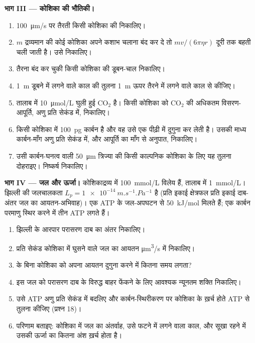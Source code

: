 \begin{problem}
\medskip
\noindent\textbf{भाग III --- कोशिका की भौतिकी।}
\begin{enumerate}[resume]
  \item \qty{100}{\micro m/s} पर तैरती किसी कोशिका की 
        निकालिए।
  \item $m$ द्रव्यमान की कोई कोशिका अपने कशाभ चलाना बंद कर दे तो
        $mv/(6\pi\eta r)$ दूरी तक बहती चली जाती है। उसे निकालिए।
  \item तैरना बंद कर चुकी किसी कोशिका की डूबन-चाल निकालिए।
  \item \qty{1}{m} डूबने में लगने वाले काल की तुलना \qty{1}{m} ऊपर
        तैरने में लगने वाले काल से कीजिए।
  \item तालाब में \qty{10}{\micro mol/L} घुली हुई
        $\mathrm{CO_2}$ है। किसी कोशिका को $\mathrm{CO_2}$ की अधिकतम
        विसरण-आपूर्ति, अणु प्रति सेकंड में, निकालिए।
  \item किसी कोशिका में \qty{100}{pg} कार्बन है और वह उसे एक पीढ़ी में
        दुगुना कर लेती है। उसकी माध्य कार्बन-माँग अणु प्रति सेकंड में,
        और आपूर्ति का माँग से अनुपात, निकालिए।
  \item उसी कार्बन-घनत्व वाली \qty{50}{\micro m} त्रिज्या की किसी
        काल्पनिक कोशिका के लिए यह तुलना दोहराइए। निष्कर्ष निकालिए।
\end{enumerate}

\medskip
\noindent\textbf{भाग IV --- जल और ऊर्जा।}
कोशिकाद्रव्य में \qty{100}{mmol/L} विलेय हैं, तालाब में
\qty{1}{mmol/L}। झिल्ली की जलचालकता $L_p =
\qty{1e-14}{m.s^{-1}.Pa^{-1}}$ है (प्रति इकाई क्षेत्रफल प्रति इकाई दाब-अंतर
जल का आयतन-अभिवाह)। एक ATP के जल-अपघटन से \qty{50}{kJ/mol} मिलते हैं;
एक कार्बन परमाणु स्थिर करने में तीन ATP लगते हैं।
\begin{enumerate}[resume]
  \item झिल्ली के आरपार परासरण दाब का अंतर निकालिए।
  \item प्रति सेकंड कोशिका में घुसने वाले जल का आयतन
        \unit{\micro m^3/s} में निकालिए।
  \item {} के बिना कोशिका को अपना आयतन दुगुना करने में
        कितना समय लगता?
  \item इस जल को परासरण दाब के विरुद्ध बाहर फेंकने के लिए आवश्यक
        न्यूनतम शक्ति निकालिए।
  \item उसे ATP अणु प्रति सेकंड में बदलिए और कार्बन-स्थिरीकरण पर कोशिका
        के ख़र्च होते ATP से तुलना कीजिए (प्रश्न 18)।
  \item परिणाम बताइए: कोशिका में जल का अंतर्वाह, उसे फटने में लगने वाला
        काल, और सूखा रहने में उसकी ऊर्जा का कितना अंश ख़र्च होता है।
\end{enumerate}
\end{problem}
